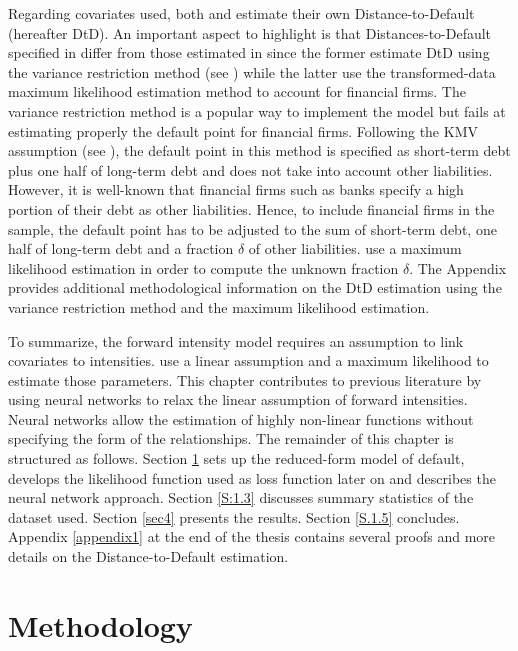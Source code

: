 Regarding covariates used, both \citet{Duan2012} and \citet{DSW} estimate their own Distance-to-Default (hereafter DtD). An important aspect to highlight is that Distances-to-Default specified in \citet{DSW} differ from those estimated in \citet{Duan2012} since the former estimate DtD using the variance restriction method (see \citep{Duan2012DTD}) while the latter use the transformed-data maximum likelihood estimation method to account for financial firms. The variance restriction method is a popular way to implement the \citet{Merton1974} model but fails at estimating properly the default point for financial firms. Following the KMV assumption (see \citet{KMV}), the default point in this method is specified as short-term debt plus one half of long-term debt and does not take into account other liabilities. However, it is well-known that financial firms such as banks specify a high portion of their debt as other liabilities. Hence, to include financial firms in the sample, the default point has to be adjusted to the sum of short-term debt, one half of long-term debt and a fraction $\delta$ of other liabilities. \citet{Duan2012} use a maximum likelihood estimation in order to compute the unknown fraction $\delta$. The Appendix provides additional methodological information on the DtD estimation using the variance restriction method and the maximum likelihood estimation. 

To summarize, the forward intensity model requires an assumption to link covariates to intensities. \citet{Duan2012} use a linear assumption and a maximum likelihood to estimate those parameters. This chapter contributes to previous literature by using neural networks to relax the linear assumption of forward intensities. Neural networks allow the estimation of highly non-linear functions without specifying the form of the relationships. The remainder of this chapter is structured as follows. Section \ref{S:1.2} sets up the reduced-form model of default, develops the likelihood function used as loss function later on and describes the neural network approach. Section \ref{S:1.3} discusses summary statistics of the dataset used. Section \ref{sec4} presents the results. Section \ref{S.1.5} concludes. Appendix \ref{appendix1} at the end of the thesis contains several proofs and more details on the Distance-to-Default estimation.


\section{Methodology}
\label{S:1.2}

